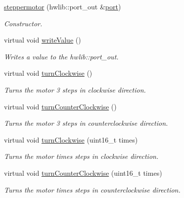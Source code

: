 \begin{DoxyCompactItemize}
\item 
\hyperlink{classsteppermotor_ac1070c1bc6c18ce902f605b13b35ae17}{steppermotor} (hwlib\+::port\+\_\+out \&\hyperlink{classsteppermotor_a46084d0eae151993b4da56d9de1136d9}{port})
\begin{DoxyCompactList}\small\item\em Constructor. \end{DoxyCompactList}\item 
virtual void \hyperlink{classsteppermotor_a62618fa568d97c9508bee0af4b66128e}{write\+Value} ()
\begin{DoxyCompactList}\small\item\em Writes a value to the hwlib\+::port\+\_\+out. \end{DoxyCompactList}\item 
virtual void \hyperlink{classsteppermotor_a5aed1fb2d8dd46435a5bc8139939c598}{turn\+Clockwise} ()
\begin{DoxyCompactList}\small\item\em Turns the motor 3 steps in clockwise direction. \end{DoxyCompactList}\item 
virtual void \hyperlink{classsteppermotor_ab896cfadddeefadb0256b1dba3598426}{turn\+Counter\+Clockwise} ()
\begin{DoxyCompactList}\small\item\em Turns the motor 3 steps in counterclockwise direction. \end{DoxyCompactList}\item 
virtual void \hyperlink{classsteppermotor_a62b4e62292f6b8de2f3552a5fd950d69}{turn\+Clockwise} (uint16\+\_\+t times)
\begin{DoxyCompactList}\small\item\em Turns the motor \textquotesingle{}times\textquotesingle{} steps in clockwise direction. \end{DoxyCompactList}\item 
virtual void \hyperlink{classsteppermotor_a4ab2f609263941da26ef0b46046848c1}{turn\+Counter\+Clockwise} (uint16\+\_\+t times)
\begin{DoxyCompactList}\small\item\em Turns the motor \textquotesingle{}times\textquotesingle{} steps in counterclockwise direction. \end{DoxyCompactList}\end{DoxyCompactItemize}
